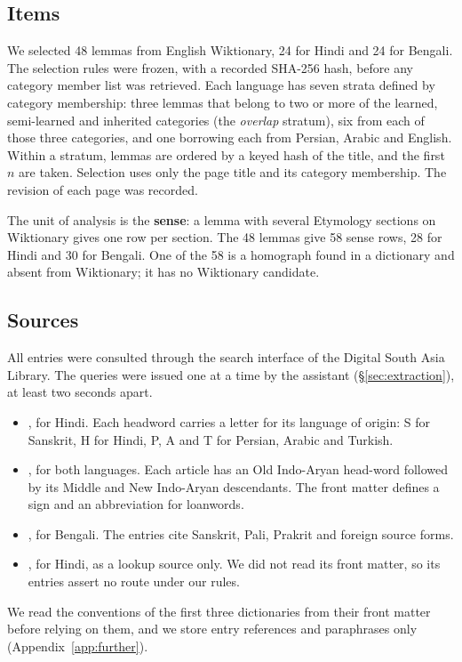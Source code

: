 \documentclass[11pt]{article}
\begin{document}
\subsection{Items}

We selected 48 lemmas from English Wiktionary, 24 for Hindi and 24 for Bengali. The selection rules were frozen, with a recorded SHA-256 hash, before any category member list was retrieved. Each language has seven strata defined by category membership: three lemmas that belong to two or more of the learned, semi-learned and inherited categories (the \textit{overlap} stratum), six from each of those three categories, and one borrowing each from Persian, Arabic and English. Within a stratum, lemmas are ordered by a keyed hash of the title, and the first $n$ are taken. Selection uses only the page title and its category membership. The revision of each page was recorded.

The unit of analysis is the \textbf{sense}: a lemma with several Etymology sections on Wiktionary gives one row per section. The 48 lemmas give 58 sense rows, 28 for Hindi and 30 for Bengali. One of the 58 is a homograph found in a dictionary and absent from Wiktionary; it has no Wiktionary candidate.

\subsection{Sources}

All entries were consulted through the search interface of the Digital South Asia Library. The queries were issued one at a time by the assistant (\S\ref{sec:extraction}), at least two seconds apart.
\begin{itemize}
\item \textbf{\citet{platts1884}}, for Hindi. Each headword carries a letter for its language of origin: S for Sanskrit, H for Hindi, P, A and T for Persian, Arabic and Turkish.
\item \textbf{\citet{turner1966cdial}}, for both languages. Each article has an Old Indo-Aryan head-word followed by its Middle and New Indo-Aryan descendants. The front matter defines a sign and an abbreviation for loanwords.
\item \textbf{\citet{dasa1937bangala}}, for Bengali. The entries cite Sanskrit, Pali, Prakrit and foreign source forms.
\item \textbf{\citet{dasa1975sabdasagara}}, for Hindi, as a lookup source only. We did not read its front matter, so its entries assert no route under our rules.
\end{itemize}
We read the conventions of the first three dictionaries from their front matter before relying on them, and we store entry references and paraphrases only (Appendix~\ref{app:further}).
\end{document}
